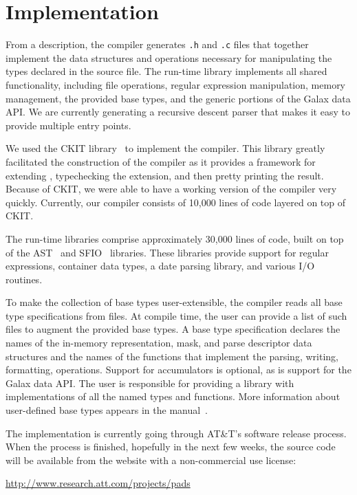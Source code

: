 \documentclass{sig-alternate}
\begin{document}
\section{Implementation}
From a \pads{} description, the \pads{} compiler generates \texttt{.h} and
\texttt{.c} files that together implement the data structures and operations 
necessary for manipulating the types declared in the source file.  The
\pads{} run-time library implements all shared functionality, including file operations, regular expression manipulation, memory management, the provided base types, and the generic portions of the Galax data API.  We are currently generating a recursive descent parser that makes it easy to provide multiple entry points.

We used the CKIT library~\cite{ckit} to implement the \pads{} compiler.
This library greatly facilitated the construction of the compiler as it
provides a framework for extending \C{}, typechecking the extension, and then pretty printing the result.  Because of CKIT, we were able to have a working version of the \pads{} compiler very quickly.
Currently, our compiler consists of 10,000 lines of \smlnj{} code layered on top of CKIT.

The \pads{} run-time libraries comprise approximately 30,000 lines of \C{} code, built on top of the AST~\cite{ast} and SFIO~\cite{sfio} libraries.
These libraries provide support for regular expressions, container data types, a date parsing library, and various I/O routines.  
 
To make the collection of base types user-extensible, the compiler reads all base type specifications from files.  
At compile time, the user can provide a list of such files to augment the provided base types.
A base type specification
declares the names of the in-memory representation, mask, and parse descriptor data structures and the names of the functions that implement the parsing, writing, formatting, \etc{} operations.  Support for accumulators is optional, as is support for the Galax data API.  The user is responsible for providing a \C{} library with implementations of all the named types and functions. 
More information about user-defined base types appears in the \pads{} manual~\cite{padsmanual}.

The \pads{} implementation is currently going through AT\&T's software
release process.  When the process is finished, hopefully in the next few weeks, the source code will be available from the \pads{} website with a non-commercial use license:
\begin{center}
\url{http://www.research.att.com/projects/pads}
\end{center}
 
\end{document}
